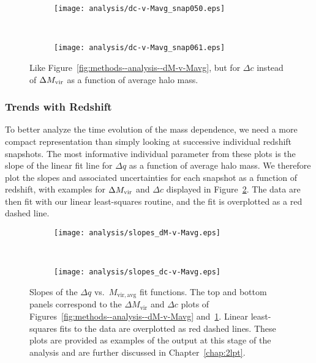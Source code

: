\begin{figure*}[tp]
	\centering
	\begin{subfigure}{}
		\texttt{[image: analysis/dc-v-Mavg\_snap050.eps]}
	\end{subfigure}
	\\
	\begin{subfigure}{}
		\texttt{[image: analysis/dc-v-Mavg\_snap061.eps]}
	\end{subfigure}
	\caption[$\Delta c$ as a function of $M_{\mathrm{vir,avg}}$]{\footnotesize Like Figure~\ref{fig:methods--analysis--dM-v-Mavg}, but for $\Delta c$ instead of $\Delta {M_{\mathrm{vir}}}$ as a function of average halo mass.}
	\label{fig:methods--analysis--dc-v-Mavg}
\end{figure*}



\subsubsection{Trends with Redshift}
\label{subsubsec:analysis--mass_trends--redshift_trends}


To better analyze the time evolution of the mass dependence, we need a more compact representation than simply looking at successive individual redshift snapshots.  The most informative individual parameter from these plots is the slope of the linear fit line for $\Delta q$ as a function of average halo mass.  We therefore plot the slopes and associated uncertainties for each snapshot as a function of redshift, with examples for $\Delta {M_{\mathrm{vir}}}$ and $\Delta c$ displayed in Figure~\ref{fig:methods--analysis--slopes_delta-v-Mavg}.  The data are then fit with our linear least-squares routine, and the fit is overplotted as a red dashed line.

\begin{figure*}[tp]
	\centering
	\begin{subfigure}{}
		\texttt{[image: analysis/slopes\_dM-v-Mavg.eps]}
	\end{subfigure}
	\\
	\begin{subfigure}{}
		\texttt{[image: analysis/slopes\_dc-v-Mavg.eps]}
	\end{subfigure}
	\caption[Slopes of the $\Delta q$ vs.\ $M_{\mathrm{vir,avg}}$ fit functions.]{\footnotesize Slopes of the $\Delta q$ vs.\ $M_{\mathrm{vir,avg}}$ fit functions.  The top and bottom panels correspond to the $\Delta M_{\mathrm{vir}}$ and $\Delta c$ plots of Figures~\ref{fig:methods--analysis--dM-v-Mavg} and~\ref{fig:methods--analysis--dc-v-Mavg}.  Linear least-squares fits to the data are overplotted as red dashed lines.  These plots are provided as examples of the output at this stage of the analysis and are further discussed in Chapter~\ref{chap:2lpt}.}
	\label{fig:methods--analysis--slopes_delta-v-Mavg}
\end{figure*}





